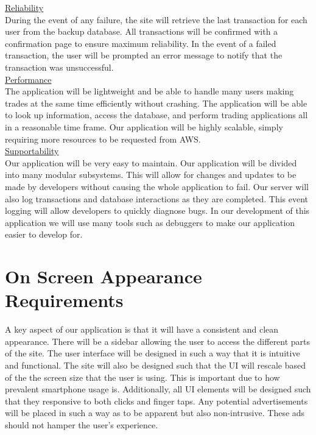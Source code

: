 \documentclass[11pt,letterpaper,oneside]{memoir}
\begin{document}
\underline{Reliability}\\
During the event of any failure, the site will retrieve the last transaction for each user from the backup database. All transactions will be confirmed with a confirmation page to ensure maximum reliability. In the event of a failed transaction, the user will be prompted an error message to notify that the transaction was unsuccessful. \\

\underline{Performance}\\
The application will be lightweight and be able to handle many users making trades at the same time efficiently without crashing. The application will be able to look up information, access the database, and perform trading applications all in a reasonable time frame. Our application will be highly scalable, simply requiring more resources to be requested from AWS. \\

\underline{Supportability}\\
Our application will be very easy to maintain. Our application will be divided into many modular subsystems. This will allow for changes and updates  to be made by developers without causing the whole application to fail. Our server will also log transactions and database interactions as they are completed. This event logging will allow developers to quickly diagnose bugs. In our development of this application we will use many tools such as debuggers to make our application easier to develop for. \\

\section{On Screen Appearance Requirements}
A key aspect of our application is that it will have a consistent and clean appearance. There will be a sidebar allowing the user to access the different parts of the site. The user interface will be designed in such a way that it is intuitive and functional.  The site will also be designed such that the UI will rescale based of the the screen size that the user is using. This is important due to how prevalent smartphone usage is. Additionally, all UI elements will be designed such that they responsive to both clicks and finger taps. Any potential advertisements will be placed in such a way as to be apparent but also non-intrusive. These ads should not hamper the user’s experience. \\
\end{document}
